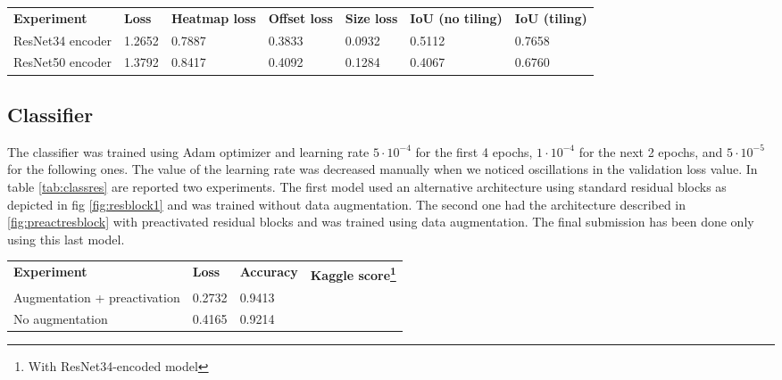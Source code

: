 \begin{table*}[h]
	\begin{tabular}{lllllll}
		\rowcolor[HTML]{EFEFEF} 
		\textbf{Experiment}   & \textbf{Loss} & \textbf{Heatmap loss} & \textbf{Offset loss} & \textbf{Size loss} & \textbf{IoU (no tiling)} & \textbf{IoU (tiling)} \\
		ResNet34 encoder      & 1.2652        & 0.7887                & 0.3833               & 0.0932             & 0.5112                   & 0.7658                \\
		ResNet50 encoder      & 1.3792        & 0.8417                & 0.4092               & 0.1284             & 0.4067                   & 0.6760
	\end{tabular}
	\caption{Experiments with two residual architecture for detection. The first one uses ResNet34 for encoding, the second one uses the deeper ResNet50.}
	\label{tab:expdetector}
\end{table*}

\subsection{Classifier}
\label{ssec:classifierexp}

The classifier was trained using Adam optimizer and learning rate $5 \cdot 10^{-4}$ for the first 4 epochs, $1 \cdot 10^{-4}$ for the next 2 epochs, and $5 \cdot 10^{-5}$ for the following ones. The value of the learning rate was decreased manually when we noticed oscillations in the validation loss value. In table \ref{tab:classres} are reported two experiments. The first model used an alternative architecture using standard residual blocks as depicted in fig \ref{fig:resblock1} and was trained without data augmentation. The second one had the architecture described in \ref{fig:preactresblock} with preactivated residual blocks and was trained using data augmentation. The final submission has been done only using this last model.

\begin{table*}[h]
	\begin{minipage}{.7\textwidth}
	\begin{tabular}{llll}
		\rowcolor[HTML]{EFEFEF} 
		\textbf{Experiment} & \textbf{Loss} & \textbf{Accuracy} & \textbf{Kaggle score\footnote{With ResNet34-encoded model}} \\
		Augmentation + preactivation & 0.2732 & 0.9413 &  \\
		No augmentation& 0.4165 & 0.9214 &
	\end{tabular}
	\end{minipage}
	\caption{Experiments with classifier with and without data augmentation. First model is trained with pre-activated residual block and data augmentation. The second one is trained with standard residual block and no augmentation.}
	\label{tab:classres}
\end{table*}

